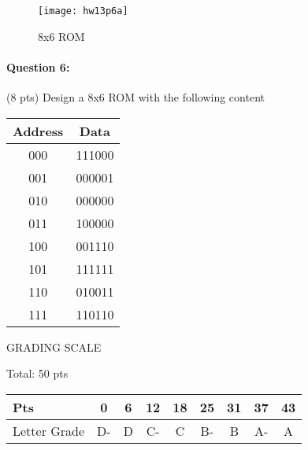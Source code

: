 \documentclass[12pt,letterpaper,titlepage]{report}
\begin{document}
\begin{raggedright}
\begin{wrapfigure}[23]{R}{0.75\textwidth}
\centering
\texttt{[image: hw13p6a]}
\caption{8x6 ROM}
\end{wrapfigure}

\paragraph{Question 6:}
(8 pts) Design a 8x6 ROM with the following content

\begin{tabular}{|c|c|}\hline
Address & Data \\ \hline
000 & 111000 \\ \hline
001 & 000001 \\ \hline
010 & 000000 \\ \hline
011 & 100000 \\ \hline
100 & 001110 \\ \hline
101 & 111111 \\ \hline
110 & 010011 \\ \hline
111 & 110110 \\ \hline
\end{tabular}



\vspace{\fill}
\noindent
GRADING SCALE
\medskip

Total: 50 pts
\bigskip

\def\arraystretch{1.5}
\begin{tabular}{ | l | c | c | c | c | c | c | c | c | } \hline
Pts          & 0  & 6  & 12 & 18 & 25 & 31 & 37 & 43     \\\hline
Letter Grade & D- & D  & C- & C  & B- & B  & A- & A      \\\hline
\end{tabular}
\end{raggedright}
\end{document}
